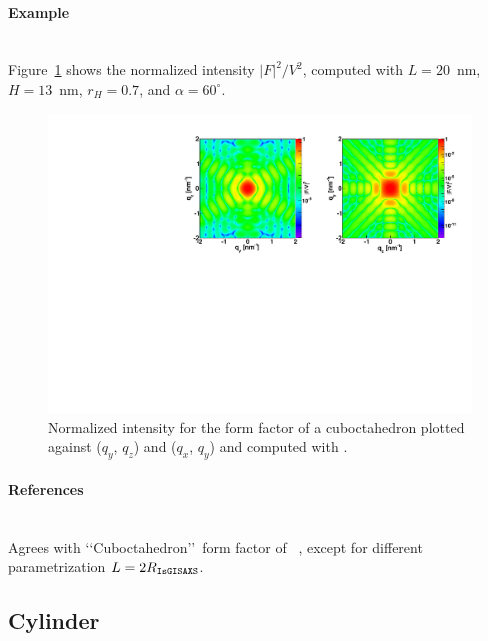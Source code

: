 \paragraph{Example}\strut\\
Figure~\ref{fig:FFcuboctahEx} shows the normalized intensity $|F|^2/V^2$, computed with $L=20$~nm, $H=13$~nm, $r_H=0.7$, and $\alpha=60^{\circ}$.
\begin{figure}[ht]
\begin{center}
\includegraphics[angle=-90,width=\textwidth]{fig/ff/figffcuboctah.pdf}
\end{center}
\caption{Normalized intensity for the form factor of a cuboctahedron plotted against ($q_y$, $q_z$) and  ($q_x$, $q_y$) and computed with .}
\label{fig:FFcuboctahEx}
\end{figure}

\paragraph{References}\strut\\
Agrees with \lq\lq Cuboctahedron\rq\rq\ form factor of \IsGISAXS~\cite{Laz02},
except for different parametrization $L=2R_{\rm{\texttt{IsGISAXS}}}$.

\newpage
\subsection{Cylinder} 
 
